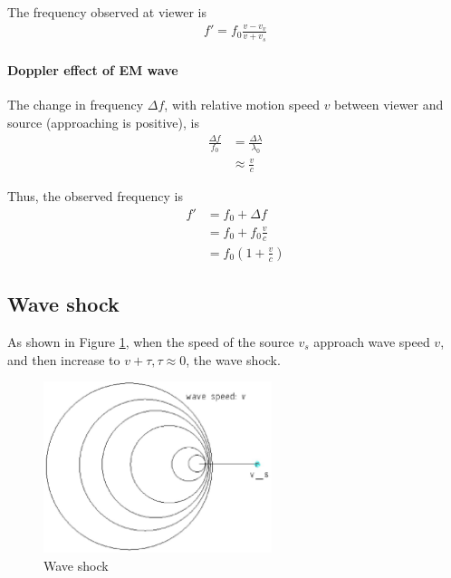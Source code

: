             The frequency observed at viewer is
            \begin{align}
                f' = f_0 \frac{v - v_v}{v + v_s}
            \end{align}

        \paragraph{Doppler effect of EM wave}
            The change in frequency $\Delta f$, with relative motion speed $v$ between viewer and source (approaching is positive), is
            \begin{align}
                \frac{\Delta f}{f_0} &= \frac{\Delta \lambda}{\lambda_0} \\
                                     &\approx \frac{v}{c}
            \end{align}

            Thus, the observed frequency is
            \begin{align}
                f' &= f_0 + \Delta f \\
                   &= f_0 + f_0 \frac{v}{c} \\
                   &= f_0 (1 + \frac{v}{c})
            \end{align}

    \subsection{Wave shock}
        As shown in Figure \ref{wave_shock}, when the speed of the source $v_s$ approach wave speed $v$, and then increase to $v + \tau, \tau \approx 0$, the wave shock. 
        \begin{figure}[H]
            \begin{center}
                \includegraphics[height=5cm]{wave_charts/wave_shock.eps}
            \end{center}
            \caption{Wave shock}
            \label{wave_shock}
        \end{figure}

